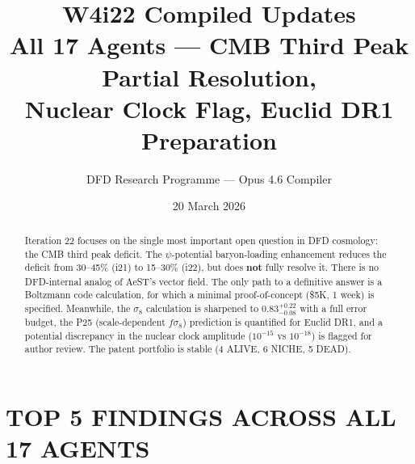 \documentclass[11pt]{article}
\title{W4i22 Compiled Updates\\
\large All 17 Agents --- CMB Third Peak Partial Resolution,\\
Nuclear Clock Flag, Euclid DR1 Preparation}
\author{DFD Research Programme --- Opus 4.6 Compiler}
\date{20 March 2026}
\begin{document}
\maketitle

\begin{abstract}
Iteration 22 focuses on the single most important open question in DFD
cosmology: the CMB third peak deficit.  The $\psi$-potential baryon-loading
enhancement reduces the deficit from 30--45\% (i21) to 15--30\% (i22),
but does \textbf{not} fully resolve it.  There is no DFD-internal analog
of AeST's vector field.  The only path to a definitive answer is a
Boltzmann code calculation, for which a minimal proof-of-concept
(\$5K, 1 week) is specified.  Meanwhile, the $\sigma_8$ calculation is
sharpened to $0.83^{+0.22}_{-0.08}$ with a full error budget, the P25
(scale-dependent $f\sigma_8$) prediction is quantified for Euclid DR1,
and a potential discrepancy in the nuclear clock amplitude
($10^{-15}$ vs $10^{-18}$) is flagged for author review.  The patent
portfolio is stable (4 ALIVE, 6 NICHE, 5 DEAD).
\end{abstract}

\tableofcontents
\newpage

\section{TOP 5 FINDINGS ACROSS ALL 17 AGENTS}
\end{document}
